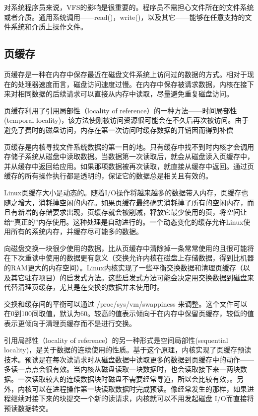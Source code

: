 对系统程序员来说，VFS的影响是很重要的。程序员不需担心文件所在的文件系统或者介质。通用系统调用——read()，write()，以及其它——能够在任意支持的文件系统和介质上操作文件。 

\subsection{页缓存}

页缓存是一种在内存中保存最近在磁盘文件系统上访问过的数据的方式。相对于现在的处理器速度而言，磁盘访问速度过慢。在内存中保存被请求数据，内核在接下来对相同数据的后续请求可以直接从内存中读取，尽量避免重复磁盘访问。

页缓存利用了引用局部性（locality of reference）的一种方法——时间局部性(temporal locality)，该方法使刚被访问资源很可能会在不久后再次被访问。由于避免了费时的磁盘访问，内存在第一次访问时缓存数据的开销因而得到补偿

页缓存是内核寻找文件系统数据的第一目的地。只有缓存中找不到时内核才会调用存储子系统从磁盘中读取数据。当数据第一次读取后，就会从磁盘读入页缓存中，并从缓存中返回给应用。如果那项数据被再次读取，就直接从缓存中返回。通过页缓存的所有操作执行都是透明的，保证它的数据总是相关且有效的。

Linux页缓存大小是动态的。随着I/O操作将越来越多的数据带入内存，页缓存也随之增大，消耗掉空闲的内存。如果页缓存最终确实消耗掉了所有的空闲内存，而且有新增的存储要求出现，页缓存就会被削减，释放它最少使用的页，将空间让给“真正的”内存使用。这种处理是自动进行的。一个动态变化的缓存允许Linux使用所有的系统内存，并缓存尽可能多的数据。

向磁盘交换一块很少使用的数据，比从页缓存中清除掉一条常常使用的且很可能将在下次重读中使用的数据更有意义（交换允许内核在磁盘上存储数据，得到比机器的RAM更大的内存空间）。Linux内核实现了一些平衡交换数据和清理页缓存（以及其它驻存项目）的启发式方法。这些启发式方法可能会决定用交换数据到磁盘来代替清理页缓存，尤其是在交换的数据并未使用时。

交换和缓存间的平衡可以通过 /proc/sys/vm/swappiness 来调整。这个文件可以在0到100间取值，默认为60。较高的值表示倾向于在内存中保留页缓存，较低的值表示更倾向于清理页缓存而不是进行交换。

引用局部性（locality of reference）的另一种形式是空间局部性(sequential locality)，是关于数据的连续使用的性质。基于这个原理，内核实现了页缓存预读技术。预读是在每次读请求时从磁盘数据中读取更多的数据到页缓存中的动作——多读一点点会很有效。当内核从磁盘读取一块数据时，也会读取接下来一两块数据。一次读取较大的连续数据块时磁盘不需要经常寻道，所以会比较有效，。另外，内核可以在进程操作第一块读取数据时完成预读。像经常发生的那样，如果进程继续对接下来的块提交一个新的读请求，内核就可以不用发起磁盘 I/O而直接将预读数据转交。


